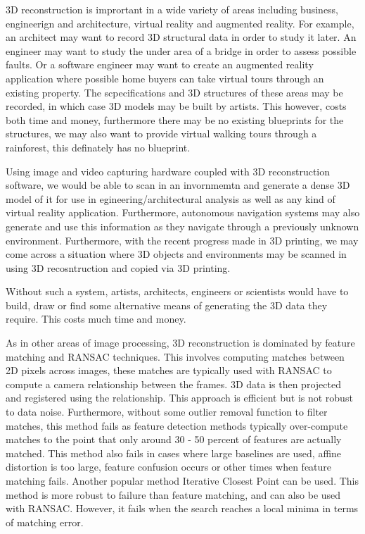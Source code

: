 3D reconstruction is imprortant in a wide variety of areas including business, engineerign and architecture, virtual reality and augmented reality. For example, an architect may want to record 3D structural data in order to study it later. An engineer may want to study the under area of a bridge in order to assess possible faults. Or a software engineer may want to create an augmented reality application where possible home buyers can take virtual tours through an existing property. The scpecifications and 3D structures of these areas may be recorded, in which case 3D models may be built by artists. This however, costs both time and money, furthermore there may be no existing blueprints for the structures, we may also want to provide virtual walking tours through a rainforest, this definately has no blueprint.

Using image and video capturing hardware coupled with 3D reconstruction software, we would be able to scan in an invornmemtn and generate a dense 3D model of it for use in egineering/architectural analysis as well as any kind of virtual reality application. Furthermore, autonomous navigation systems may also generate and use this information as they navigate through a previously unknown environment. Furthermore, with the recent progress made in 3D printing, we may come across a situation where 3D objects and environments may be scanned in using 3D recosntruction and copied via 3D printing.


Without such a system, artists, architects, engineers or scientists would have to build, draw or find some alternative means of generating the 3D data they require. This costs much time and money.

As in other areas of image processing, 3D reconstruction is dominated by feature matching and RANSAC techniques. This involves computing matches between 2D pixels across images, these matches are typically used with RANSAC to compute a camera relationship between the frames. 3D data is then projected and registered using the relationship. This approach is efficient but is not robust to data noise. Furthermore, without some outlier removal function to filter matches, this method fails as feature detection methods typically over-compute matches to the point that only around 30 - 50 percent of features are actually matched. This method also fails in cases where large baselines are used, affine distortion is too large, feature confusion occurs or other times when feature matching fails. Another popular method Iterative Closest Point can be used. This method is more robust to failure than feature matching, and can also be used with RANSAC. However, it fails when the search reaches a local minima in terms of matching error.

